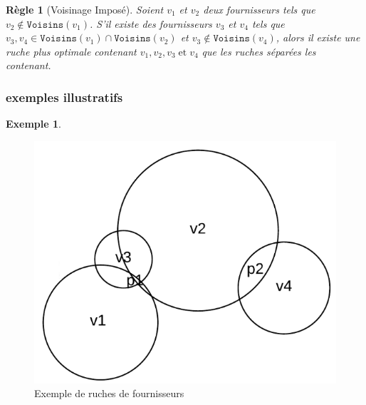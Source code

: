 \documentclass[a4paper,12pt]{book}
\theoremstyle{break}
\theoremstyle{break}
\theoremstyle{break}
\theoremstyle{break}
\newtheorem*{constraint}{Règle}
\theoremstyle{definition}
\newtheorem*{example}{Exemple}
\theoremstyle{remark}
\begin{document}
\begin{constraint}[Voisinage Imposé]
Soient $v_1$ et $v_2$ deux fournisseurs tels que $v_2 \notin \texttt{Voisins}(v_1)$. S'il existe des fournisseurs $v_3$ et $v_4$ tels que $v_3, v_4 \in \texttt{Voisins}(v_1) \cap \texttt{Voisins}(v_2)$ et $v_3 \notin \texttt{Voisins}(v_4)$, alors il existe une ruche plus optimale contenant $v_1, v_2, v_3\; \text{et}\; v_4$ que les ruches séparées les contenant.
\end{constraint}

\subsubsection{exemples illustratifs}
\begin{example}
\begin{figure}
  \centering
  \includegraphics[scale=0.3]{images/exemple_introductif1.png}
  \caption{Exemple de ruches de fournisseurs}
  \label{fig:exemple_introductif_1}
\end{figure}


\end{example}
\end{document}
